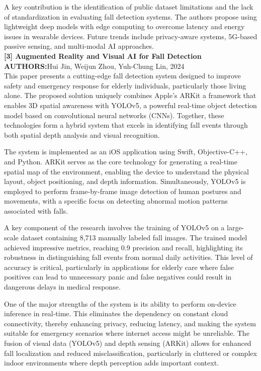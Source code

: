\documentclass[a4paper, 12pt]{report}
\begin{document}
A key contribution is the identification of public dataset limitations and the lack of standardization in evaluating fall detection systems. The authors propose using lightweight deep models with edge computing to overcome latency and energy issues in wearable devices. Future trends include privacy-aware systems, 5G-based passive sensing, and multi-modal AI approaches.\\
\noindent\textbf{[3] Augmented Reality and Visual AI for Fall Detection}\\
\textbf{AUTHORS:}Hui Jin, Weijun Zhou, Yuh-Chung Lin, 2024\\
This paper presents a cutting-edge fall detection system designed to improve safety and emergency response for elderly individuals, particularly those living alone. The proposed solution uniquely combines Apple's ARKit a framework that enables 3D spatial awareness with YOLOv5, a powerful real-time object detection model based on convolutional neural networks (CNNs). Together, these technologies form a hybrid system that excels in identifying fall events through both spatial depth analysis and visual recognition.

The system is implemented as an iOS application using Swift, Objective-C++, and Python. ARKit serves as the core technology for generating a real-time spatial map of the environment, enabling the device to understand the physical layout, object positioning, and depth information. Simultaneously, YOLOv5 is employed to perform frame-by-frame image detection of human postures and movements, with a specific focus on detecting abnormal motion patterns associated with falls.

A key component of the research involves the training of YOLOv5 on a large-scale dataset containing 8,713 manually labeled fall images. The trained model achieved impressive metrics, reaching 0.9 precision and recall, highlighting its robustness in distinguishing fall events from normal daily activities. This level of accuracy is critical, particularly in applications for elderly care where false positives can lead to unnecessary panic and false negatives could result in dangerous delays in medical response.

One of the major strengths of the system is its ability to perform on-device inference in real-time. This eliminates the dependency on constant cloud connectivity, thereby enhancing privacy, reducing latency, and making the system suitable for emergency scenarios where internet access might be unreliable. The fusion of visual data (YOLOv5) and depth sensing (ARKit) allows for enhanced fall localization and reduced misclassification, particularly in cluttered or complex indoor environments where depth perception adds important context.
\end{document}

